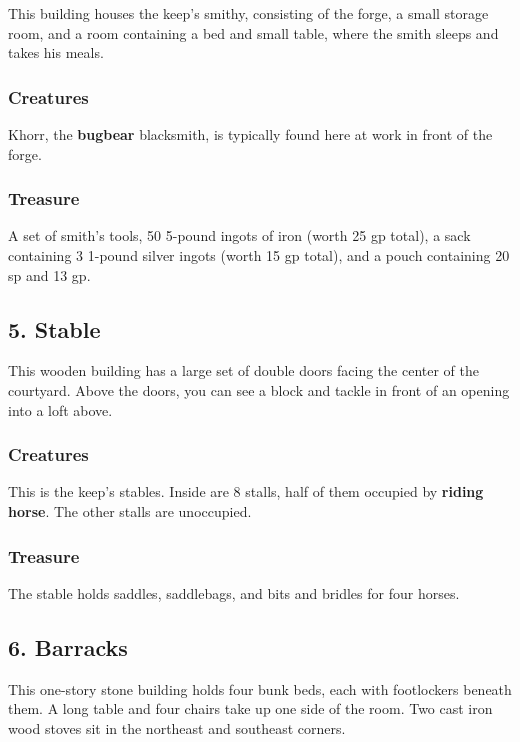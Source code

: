 \documentclass[10pt,a4paper,twoside,bg=print,twocolumn,openany,nodeprecatedcode]{dndbook}
\begin{document}
This building houses the keep's smithy, consisting of the forge, a small storage room, and a room containing a bed and small table, where the smith sleeps and takes his meals.

\subsubsection{Creatures}
Khorr, the \textbf{bugbear} blacksmith, is typically found here at work in front of the forge.

\subsubsection{Treasure}
A set of smith's tools, 50 5-pound ingots of iron (worth 25 gp total), a sack containing 3 1-pound silver ingots (worth 15 gp total), and a pouch containing 20 sp and 13 gp.

\subsection{5. Stable}
\begin{DndReadAloud}{}
This wooden building has a large set of double doors facing the center of the courtyard. Above the doors, you can see a block and tackle in front of an opening into a loft above.

\end{DndReadAloud}

\subsubsection{Creatures}
This is the keep's stables. Inside are 8 stalls, half of them occupied by \textbf{riding horse}. The other stalls are unoccupied.

\subsubsection{Treasure}
The stable holds saddles, saddlebags, and bits and bridles for four horses.

\subsection{6. Barracks}
\begin{DndReadAloud}{}
This one-story stone building holds four bunk beds, each with footlockers beneath them. A long table and four chairs take up one side of the room. Two cast iron wood stoves sit in the northeast and southeast corners.

\end{DndReadAloud}
\end{document}
